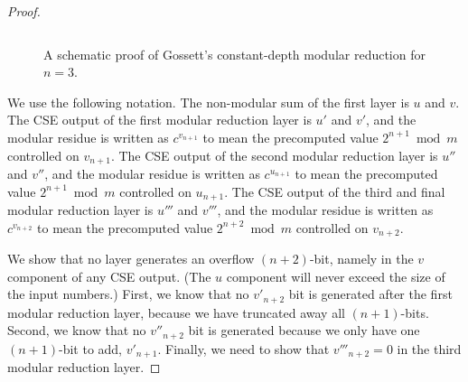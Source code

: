 \begin{proof}
\begin{center}
\begin{figure}[h!tb]
\begin{displaymath}
\end{displaymath}
\caption{A schematic proof of Gossett's constant-depth modular reduction for $n=3$.}
\label{fig:csa-proof}
\end{figure}
\end{center}

We use the following notation.
The non-modular sum of the first layer is $u$ and $v$.
The CSE output of the first modular reduction layer
is $u'$ and $v'$, and the modular residue is
written as $c^{v_{n+1}}$ to mean the precomputed value $2^{n+1} \bmod m$
controlled on $v_{n+1}$.
The CSE output of the second modular reduction layer
is $u''$ and $v''$, and the modular residue is written as
$c^{u_{n+1}}$ to mean the precomputed value $2^{n+1} \bmod m$
controlled on $u_{n+1}$.
The CSE output of the third and final modular reduction layer
is $u'''$ and $v'''$, and the modular residue is written as
$c^{v_{n+2}}$ to mean the precomputed value $2^{n+2} \bmod m$
controlled on $v_{n+2}$.

We show that no layer generates an overflow $(n+2)$-bit, namely in the
$v$ component of any CSE output. (The $u$ component will never exceed the
size of the input numbers.) First, we know that no $v'_{n+2}$ bit
is generated after the first modular reduction layer, because we have
truncated away all $(n+1)$-bits. Second, we know that no $v''_{n+2}$ bit is
generated because we only have one $(n+1)$-bit to add, $v'_{n+1}$.
Finally, we need to show that $v'''_{n+2} = 0$ in the third modular reduction
layer. 


\end{proof}

